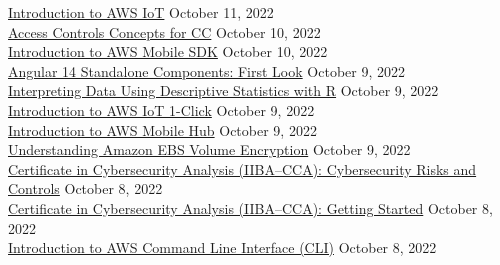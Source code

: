 \documentclass[10pt]{res} %
\begin{document}
\begin{resume}
\href{https://bjdelacruz.dev/files/certificates/pluralsight/Introduction_to_AWS_IoT.pdf}{\color{blue}Introduction to AWS IoT} \hfill October 11, 2022 \\
\href{https://bjdelacruz.dev/files/certificates/pluralsight/3_Access_Controls_Concepts_for_CC.pdf}{\color{blue}Access Controls Concepts for CC\textservicemark} \hfill October 10, 2022 \\
\href{https://bjdelacruz.dev/files/certificates/pluralsight/Introduction_to_AWS_Mobile_SDK.pdf}{\color{blue}Introduction to AWS Mobile SDK} \hfill October 10, 2022 \\
\href{https://bjdelacruz.dev/files/certificates/pluralsight/Angular_14_Standalone_Components_First_Look.pdf}{\color{blue}Angular 14 Standalone Components: First Look} \hfill October 9, 2022 \\
\href{https://bjdelacruz.dev/files/certificates/pluralsight/Interpreting_Data_Using_Descriptive_Statistics_with_R.pdf}{\color{blue}Interpreting Data Using Descriptive Statistics with R} \hfill October 9, 2022 \\
\href{https://bjdelacruz.dev/files/certificates/pluralsight/Introduction_to_AWS_IoT_1_Click.pdf}{\color{blue}Introduction to AWS IoT 1-Click} \hfill October 9, 2022 \\
\href{https://bjdelacruz.dev/files/certificates/pluralsight/Introduction_to_AWS_Mobile_Hub.pdf}{\color{blue}Introduction to AWS Mobile Hub} \hfill October 9, 2022 \\
\href{https://bjdelacruz.dev/files/certificates/pluralsight/Understanding_Amazon_EBS_Volume_Encryption.pdf}{\color{blue}Understanding Amazon EBS Volume Encryption} \hfill October 9, 2022 \\
\href{https://bjdelacruz.dev/files/certificates/pluralsight/6_Certificate_in_Cybersecurity_Analysis_IIBA_CCA_Cybersecurity_Risks_and_Controls.pdf}{\color{blue}Certificate in Cybersecurity Analysis (IIBA\textsuperscript{\textregistered}--CCA): Cybersecurity Risks and Controls} \hfill October 8, 2022 \\
\href{https://bjdelacruz.dev/files/certificates/pluralsight/1_Certificate_in_Cybersecurity_Analysis_IIBA_CCA_Getting_Started.pdf}{\color{blue}Certificate in Cybersecurity Analysis (IIBA\textsuperscript{\textregistered}--CCA): Getting Started} \hfill October 8, 2022 \\
\href{https://bjdelacruz.dev/files/certificates/pluralsight/Introduction_to_AWS_Command_Line_Interface_CLI.pdf}{\color{blue}Introduction to AWS Command Line Interface (CLI)} \hfill October 8, 2022 \\

\end{resume}
\end{document}
